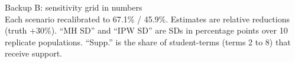 \documentclass[aspectratio=169,11pt]{beamer}
\begin{document}
\begin{frame}{Backup B: sensitivity grid in numbers}
\centering\scriptsize
\\[2mm]
{\tiny Each scenario recalibrated to 67.1\% / 45.9\%. Estimates are relative reductions (truth $+30\%$). ``MH SD'' and ``IPW SD'' are SDs in percentage points over 10 replicate populations. ``Supp.'' is the share of student-terms (terms 2 to 8) that receive support.}
\end{frame}
\end{document}
